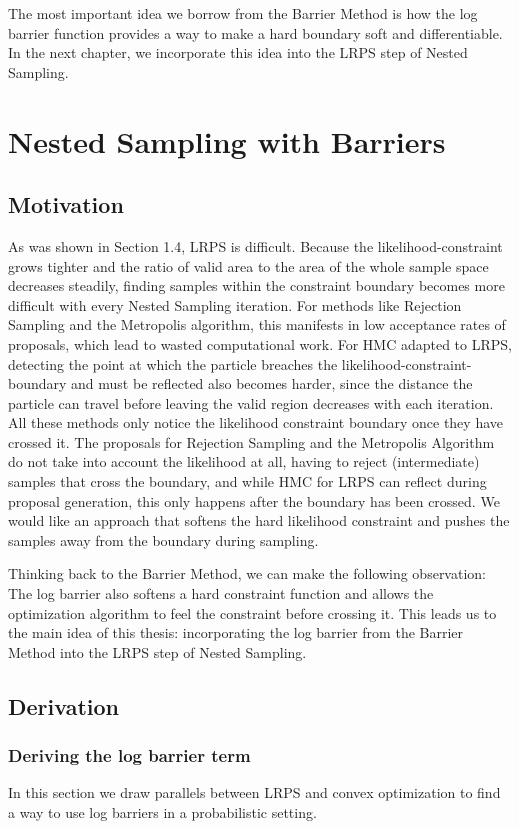 \documentclass[12pt, a4paper]{report}
\begin{document}
The most important idea we borrow from the Barrier Method is how the log barrier function provides a way to make a hard boundary soft and differentiable.
In the next chapter, we incorporate this idea into the LRPS step of Nested Sampling.


\chapter{Nested Sampling with Barriers}

\section{Motivation}
As was shown in Section 1.4, LRPS is difficult.
Because the likelihood-constraint grows tighter and the ratio of valid area to the area of the whole sample space decreases steadily, finding samples within the constraint boundary becomes more difficult with every Nested Sampling iteration.
For methods like Rejection Sampling and the Metropolis algorithm, this manifests in low acceptance rates of proposals, which lead to wasted computational work.
For HMC adapted to LRPS, detecting the point at which the particle breaches the likelihood-constraint-boundary and must be reflected also becomes harder, since the distance the particle can travel before leaving the valid region decreases with each iteration.
All these methods only notice the likelihood constraint boundary once they have crossed it.
The proposals for Rejection Sampling and the Metropolis Algorithm do not take into account the likelihood at all, having to reject (intermediate) samples that cross the boundary, and while HMC for LRPS can reflect during proposal generation, this only happens after the boundary has been crossed.
We would like an approach that softens the hard likelihood constraint and pushes the samples away from the boundary during sampling.

Thinking back to the Barrier Method, we can make the following observation:
The log barrier also softens a hard constraint function and allows the optimization algorithm to feel the constraint before crossing it.
This leads us to the main idea of this thesis: incorporating the log barrier from the Barrier Method into the LRPS step of Nested Sampling.

\section{Derivation}
\subsection{Deriving the log barrier term}
In this section we draw parallels between LRPS and convex optimization to find a way to use log barriers in a probabilistic setting.
\end{document}
